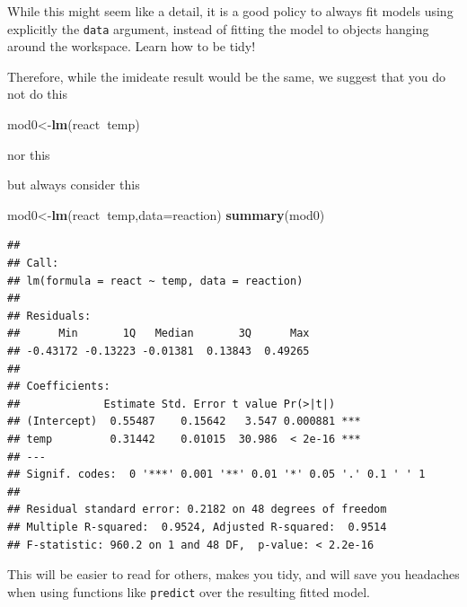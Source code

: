 \documentclass[
]{book}
\newenvironment{Shaded}{\begin{snugshade}}{\end{snugshade}}
\newcommand{\DataTypeTok}[1]{\textcolor[rgb]{0.13,0.29,0.53}{#1}}
\newcommand{\KeywordTok}[1]{\textcolor[rgb]{0.13,0.29,0.53}{\textbf{#1}}}
\newcommand{\NormalTok}[1]{#1}
\newcommand{\OperatorTok}[1]{\textcolor[rgb]{0.81,0.36,0.00}{\textbf{#1}}}
\begin{document}
While this might seem like a detail, it is a good policy to always fit models using explicitly the \texttt{data} argument, instead of fitting the model to objects hanging around the workspace. Learn how to be tidy!

Therefore, while the imideate result would be the same, we suggest that you do not do this

\begin{Shaded}
\begin{Highlighting}[]
\NormalTok{mod0<-}\KeywordTok{lm}\NormalTok{(react}\OperatorTok{~}\NormalTok{temp)}
\end{Highlighting}
\end{Shaded}

nor this

\begin{Shaded}
\end{Shaded}

but always consider this

\begin{Shaded}
\begin{Highlighting}[]
\NormalTok{mod0<-}\KeywordTok{lm}\NormalTok{(react}\OperatorTok{~}\NormalTok{temp,}\DataTypeTok{data=}\NormalTok{reaction)}
\KeywordTok{summary}\NormalTok{(mod0)}
\end{Highlighting}
\end{Shaded}

\begin{verbatim}
## 
## Call:
## lm(formula = react ~ temp, data = reaction)
## 
## Residuals:
##      Min       1Q   Median       3Q      Max 
## -0.43172 -0.13223 -0.01381  0.13843  0.49265 
## 
## Coefficients:
##             Estimate Std. Error t value Pr(>|t|)    
## (Intercept)  0.55487    0.15642   3.547 0.000881 ***
## temp         0.31442    0.01015  30.986  < 2e-16 ***
## ---
## Signif. codes:  0 '***' 0.001 '**' 0.01 '*' 0.05 '.' 0.1 ' ' 1
## 
## Residual standard error: 0.2182 on 48 degrees of freedom
## Multiple R-squared:  0.9524,	Adjusted R-squared:  0.9514 
## F-statistic: 960.2 on 1 and 48 DF,  p-value: < 2.2e-16
\end{verbatim}

This will be easier to read for others, makes you tidy, and will save you headaches when using functions like \texttt{predict} over the resulting fitted model.
\end{document}
